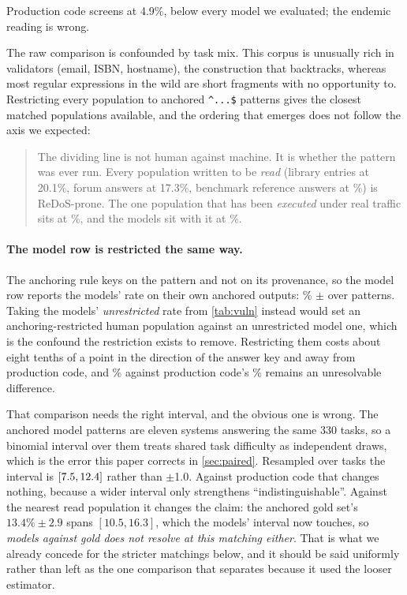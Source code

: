 \documentclass[11pt]{article}
\begin{document}
Production code screens at 4.9\%, below every model we evaluated; the endemic
reading is wrong.

The raw comparison is confounded by task mix. This corpus is unusually rich
in validators (email, ISBN, hostname), the construction that backtracks,
whereas most regular expressions in the wild are short fragments with no
opportunity to. Restricting every population to anchored
\texttt{\^{}...\$} patterns gives the closest matched populations available,
and the ordering that emerges does not follow the axis we expected:

\begin{quote}
The dividing line is not human against machine. It is whether the pattern was
ever run. Every population written to be \emph{read} (library entries at
20.1\%, forum answers at 17.3\%, benchmark reference answers at
\anchoredgold{}\%) is ReDoS-prone. The one population that has been
\emph{executed} under real traffic sits at \anchoredprod{}\%, and the models
sit with it at \anchoredmodels{}\%.
\end{quote}

\paragraph{The model row is restricted the same way.} The anchoring rule keys
on the pattern and not on its provenance, so the model row reports the models'
rate on their own anchored outputs: \anchoredmodels{}\% $\pm$
\anchoredmodelsci{} over \anchoredmodelsn{} patterns. Taking the models'
\emph{unrestricted} rate from \cref{tab:vuln} instead would set an
anchoring-restricted human population against an unrestricted model one, which
is the confound the restriction exists to remove. Restricting them costs about eight
tenths of a point in the direction of the answer key and away from production
code, and \anchoredmodels{}\% against production code's
\anchoredprod{}\% remains an unresolvable difference.

That comparison needs the right interval, and the obvious one is wrong. The
\anchoredmodelsn{} anchored model patterns are eleven systems answering the
same 330 tasks, so a binomial interval over them treats shared task difficulty
as independent draws, which is the error this paper corrects in
\cref{sec:paired}. Resampled over tasks the
interval is $[7.5{}, 12.4{}]$ rather than $\pm$1.0.
Against production code that changes nothing, because a wider interval only
strengthens ``indistinguishable''. Against the nearest read population it
changes the claim: the anchored gold set's $13.4\% \pm 2.9$ spans
$[10.5, 16.3]$, which the models' interval now touches, so
\emph{models against gold does not resolve at this matching either}. That is
what we already concede for the stricter matchings below, and it should be
said uniformly rather than left as the one comparison that separates because
it used the looser estimator.
\end{document}

